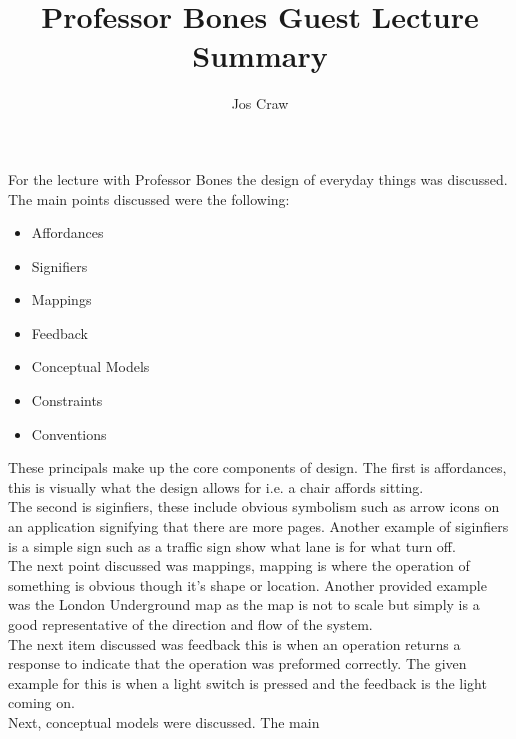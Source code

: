 \documentclass{article}
\title{Professor Bones Guest Lecture Summary}
\author{Jos Craw}
\begin{document}
\maketitle{}
For the lecture with Professor Bones the design of everyday things was discussed. The main points
discussed were the following:

\begin{itemize}
    \item{Affordances}
    \item{Signifiers}
    \item{Mappings}
    \item{Feedback}
    \item{Conceptual Models}
    \item{Constraints}
    \item{Conventions}
\end{itemize}

These principals make up the core components of design. The first is affordances, this is visually
what the design allows for i.e. a chair affords sitting.\\

The second is siginfiers, these include obvious symbolism such as arrow icons on an application
signifying that there are more pages. Another example of siginfiers is a simple sign such as a
traffic sign show what lane is for what turn off.\\

The next point discussed was mappings, mapping is where the operation of something is
obvious though it's shape or location. Another provided example was the London Underground map as
the map is not to scale but simply is a good representative of the direction and flow of the
system.\\

The next item discussed was feedback this is when an operation returns a response to indicate that
the operation was preformed correctly. The given example for this is when a light switch is
pressed and the feedback is the light coming on.\\

Next, conceptual models were discussed. The main 
\end{document}

